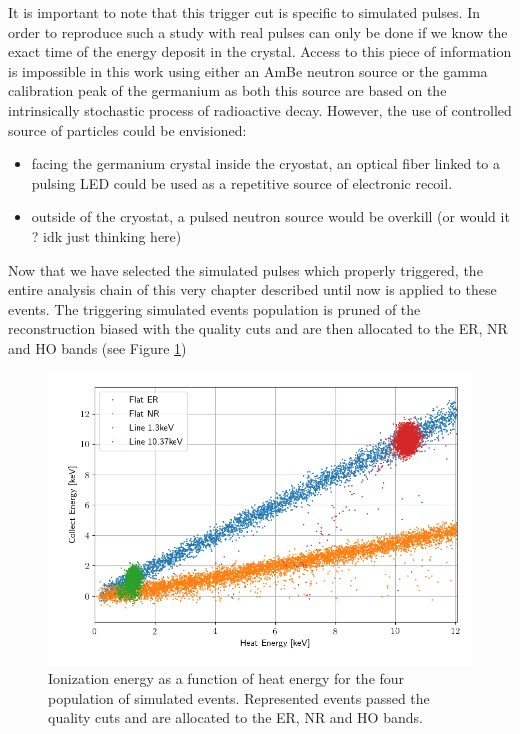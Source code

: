 It is important to note that this trigger cut is specific to simulated pulses. In order to reproduce such a study with real pulses can only be done if we know the exact time of the energy deposit in the crystal. Access to this piece of information is impossible in this work using either an AmBe neutron source or the gamma calibration peak of the germanium as both this source are based on the intrinsically stochastic process of radioactive decay. However, the use of controlled source of particles could be envisioned:
\begin{itemize}
	\item facing the germanium crystal inside the cryostat, an optical fiber linked to a pulsing LED could be used as a repetitive source of electronic recoil.
	\item outside of the cryostat, a pulsed neutron source would be overkill (or would it ? idk just thinking here)
\end{itemize}

Now that we have selected the simulated pulses which properly triggered, the entire analysis chain of this very chapter \label{ChapterNeutron} described until now is applied to these events. The triggering simulated events population is pruned of the reconstruction biased with the quality cuts and are then allocated to the ER, NR and HO bands (see Figure \ref{fig:band-cut-ecei-simu})

\begin{figure}
\centering
\includegraphics[width=\linewidth,]{Figures/Neutron/band_cut_ecei_simu.png}
\caption{Ionization energy as a function of heat energy for the four population of simulated events. Represented events passed the quality cuts and are allocated to the ER, NR and HO bands.}
\label{fig:band-cut-ecei-simu}
\end{figure}



